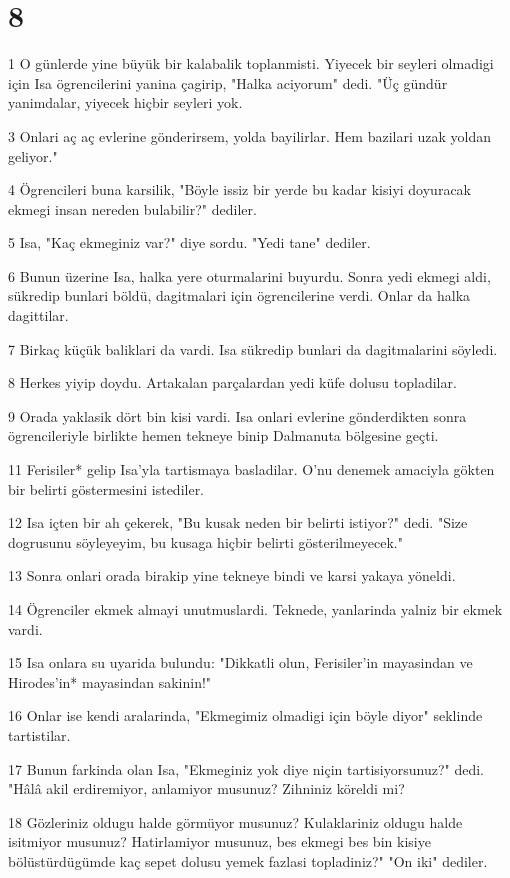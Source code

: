 \chapter{8}

\par 1 O günlerde yine büyük bir kalabalik toplanmisti. Yiyecek bir seyleri olmadigi için Isa ögrencilerini yanina çagirip, "Halka aciyorum" dedi. "Üç gündür yanimdalar, yiyecek hiçbir seyleri yok.
\par 3 Onlari aç aç evlerine gönderirsem, yolda bayilirlar. Hem bazilari uzak yoldan geliyor."
\par 4 Ögrencileri buna karsilik, "Böyle issiz bir yerde bu kadar kisiyi doyuracak ekmegi insan nereden bulabilir?" dediler.
\par 5 Isa, "Kaç ekmeginiz var?" diye sordu. "Yedi tane" dediler.
\par 6 Bunun üzerine Isa, halka yere oturmalarini buyurdu. Sonra yedi ekmegi aldi, sükredip bunlari böldü, dagitmalari için ögrencilerine verdi. Onlar da halka dagittilar.
\par 7 Birkaç küçük baliklari da vardi. Isa sükredip bunlari da dagitmalarini söyledi.
\par 8 Herkes yiyip doydu. Artakalan parçalardan yedi küfe dolusu topladilar.
\par 9 Orada yaklasik dört bin kisi vardi. Isa onlari evlerine gönderdikten sonra ögrencileriyle birlikte hemen tekneye binip Dalmanuta bölgesine geçti.
\par 11 Ferisiler* gelip Isa'yla tartismaya basladilar. O'nu denemek amaciyla gökten bir belirti göstermesini istediler.
\par 12 Isa içten bir ah çekerek, "Bu kusak neden bir belirti istiyor?" dedi. "Size dogrusunu söyleyeyim, bu kusaga hiçbir belirti gösterilmeyecek."
\par 13 Sonra onlari orada birakip yine tekneye bindi ve karsi yakaya yöneldi.
\par 14 Ögrenciler ekmek almayi unutmuslardi. Teknede, yanlarinda yalniz bir ekmek vardi.
\par 15 Isa onlara su uyarida bulundu: "Dikkatli olun, Ferisiler'in mayasindan ve Hirodes'in* mayasindan sakinin!"
\par 16 Onlar ise kendi aralarinda, "Ekmegimiz olmadigi için böyle diyor" seklinde tartistilar.
\par 17 Bunun farkinda olan Isa, "Ekmeginiz yok diye niçin tartisiyorsunuz?" dedi. "Hâlâ akil erdiremiyor, anlamiyor musunuz? Zihniniz köreldi mi?
\par 18 Gözleriniz oldugu halde görmüyor musunuz? Kulaklariniz oldugu halde isitmiyor musunuz? Hatirlamiyor musunuz, bes ekmegi bes bin kisiye bölüstürdügümde kaç sepet dolusu yemek fazlasi topladiniz?" "On iki" dediler.
